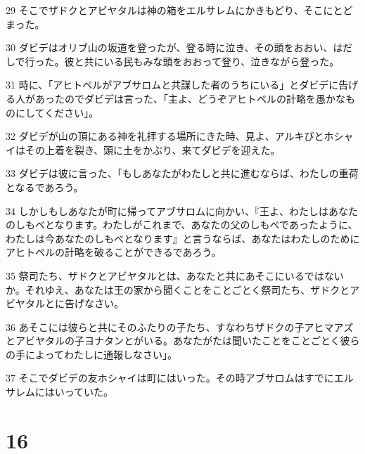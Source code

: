 \par 29 そこでザドクとアビヤタルは神の箱をエルサレムにかきもどり、そこにとどまった。
\par 30 ダビデはオリブ山の坂道を登ったが、登る時に泣き、その頭をおおい、はだしで行った。彼と共にいる民もみな頭をおおって登り、泣きながら登った。
\par 31 時に、「アヒトペルがアブサロムと共謀した者のうちにいる」とダビデに告げる人があったのでダビデは言った、「主よ、どうぞアヒトペルの計略を愚かなものにしてください」。
\par 32 ダビデが山の頂にある神を礼拝する場所にきた時、見よ、アルキびとホシャイはその上着を裂き、頭に土をかぶり、来てダビデを迎えた。
\par 33 ダビデは彼に言った、「もしあなたがわたしと共に進むならば、わたしの重荷となるであろう。
\par 34 しかしもしあなたが町に帰ってアブサロムに向かい、『王よ、わたしはあなたのしもべとなります。わたしがこれまで、あなたの父のしもべであったように、わたしは今あなたのしもべとなります』と言うならば、あなたはわたしのためにアヒトペルの計略を破ることができるであろう。
\par 35 祭司たち、ザドクとアビヤタルとは、あなたと共にあそこにいるではないか。それゆえ、あなたは王の家から聞くことをことごとく祭司たち、ザドクとアビヤタルとに告げなさい。
\par 36 あそこには彼らと共にそのふたりの子たち、すなわちザドクの子アヒマアズとアビヤタルの子ヨナタンとがいる。あなたがたは聞いたことをことごとく彼らの手によってわたしに通報しなさい」。
\par 37 そこでダビデの友ホシャイは町にはいった。その時アブサロムはすでにエルサレムにはいっていた。

\chapter{16}

